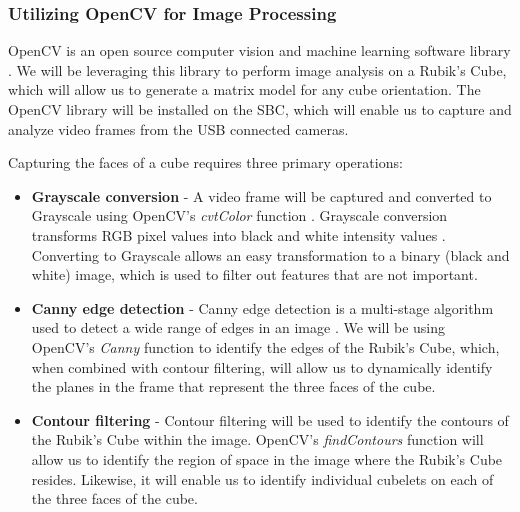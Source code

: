 \documentclass[final, letterpaper, 10 pt, conference, onecolumn]{IEEEtran}
\begin{document}
\subsubsection{Utilizing OpenCV for Image Processing}
\label{sec:image processing}
OpenCV is an open source computer vision and machine learning software library \cite{OpenCV}. We will be leveraging this library to perform image analysis on a Rubik's Cube, which will allow us to generate a matrix model for any cube orientation. The OpenCV library will be installed on the SBC, which will enable us to capture and analyze video frames from the USB connected cameras.

Capturing the faces of a cube requires three primary operations:

\begin{itemize}
  \item \textbf{Grayscale conversion} -
 A video frame will be captured and converted to Grayscale using OpenCV's \textit{cvtColor} function \cite{cvtColor}. Grayscale conversion transforms RGB pixel values into black and white intensity values \cite{Grayscale}. Converting to Grayscale allows an easy transformation to a binary (black and white) image, which is used to filter out features that are not important.
  \item  \textbf{Canny edge detection} -
 Canny edge detection is a multi-stage algorithm used to detect a wide range of edges in an image \cite{CannyEdgeDetection, MoeslundEdgeDetection}. We will be using OpenCV's \textit{Canny} function \cite{OpenCVCanny} to identify the edges of the Rubik's Cube, which, when combined with contour filtering, will allow us to dynamically identify the planes in the frame that represent the three faces of the cube.

  \item \textbf{Contour filtering} -
 Contour filtering will be used to identify the contours of the Rubik's Cube within the image. OpenCV's \textit{findContours} function \cite{findContours, Suzuki85} will allow us to identify the region of space in the image where the Rubik's Cube resides. Likewise, it will enable us to identify individual cubelets on each of the three faces of the cube.
\end{itemize}
\end{document}
